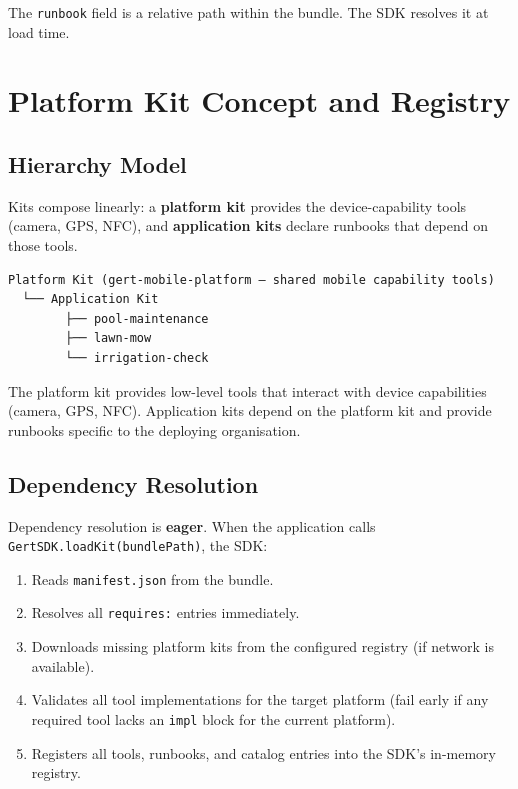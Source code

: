 The \texttt{runbook} field is a relative path within the bundle. The SDK resolves it at load time.

\section{Platform Kit Concept and Registry}

\subsection{Hierarchy Model}

Kits compose linearly: a \textbf{platform kit} provides the device-capability tools (camera, GPS, NFC), and \textbf{application kits} declare runbooks that depend on those tools.

\begin{verbatim}
Platform Kit (gert-mobile-platform — shared mobile capability tools)
  └── Application Kit
        ├── pool-maintenance
        ├── lawn-mow
        └── irrigation-check
\end{verbatim}

The platform kit provides low-level tools that interact with device capabilities (camera, GPS, NFC). Application kits depend on the platform kit and provide runbooks specific to the deploying organisation.

\subsection{Dependency Resolution}

Dependency resolution is \textbf{eager}. When the application calls \texttt{GertSDK.loadKit(bundlePath)}, the SDK:

\begin{enumerate}
  \item Reads \texttt{manifest.json} from the bundle.
  \item Resolves all \texttt{requires:} entries immediately.
  \item Downloads missing platform kits from the configured registry (if network is available).
  \item Validates all tool implementations for the target platform (fail early if any required tool lacks an \texttt{impl} block for the current platform).
  \item Registers all tools, runbooks, and catalog entries into the SDK's in-memory registry.
\end{enumerate}

